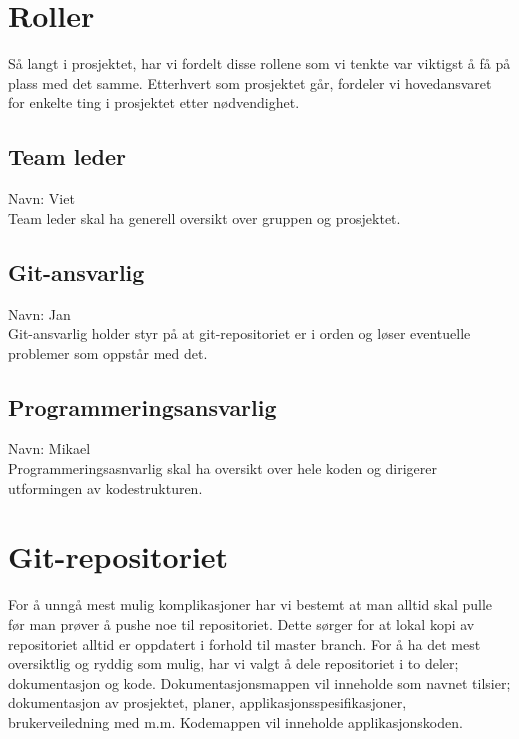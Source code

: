 \documentclass{article}
\begin{document}
\maketitle

\section*{Roller}
Så langt i prosjektet, har vi fordelt disse rollene som vi tenkte var viktigst å få på plass med det samme. Etterhvert som prosjektet går, fordeler
vi hovedansvaret for enkelte ting i prosjektet etter nødvendighet.\\
\subsection*{Team leder}
Navn: Viet\\
Team leder skal ha generell oversikt over gruppen og prosjektet.

\subsection*{Git-ansvarlig}
Navn: Jan\\
Git-ansvarlig holder styr på at git-repositoriet er i orden og løser eventuelle problemer som oppstår med det.

\subsection*{Programmeringsansvarlig}
Navn: Mikael\\
Programmeringsasnvarlig skal ha oversikt over hele koden og dirigerer utformingen av kodestrukturen.

\section*{Git-repositoriet}
For å unngå mest mulig komplikasjoner har vi bestemt at man alltid skal pulle før man prøver å pushe noe til repositoriet. Dette sørger for at lokal kopi av repositoriet alltid er oppdatert i forhold til master branch. For å ha det mest oversiktlig og ryddig som mulig, har vi valgt å dele repositoriet i to deler; dokumentasjon og kode. Dokumentasjonsmappen vil inneholde som navnet tilsier; dokumentasjon av prosjektet, planer, applikasjonsspesifikasjoner, brukerveiledning med m.m. Kodemappen vil inneholde applikasjonskoden.

\newpage
\end{document}
